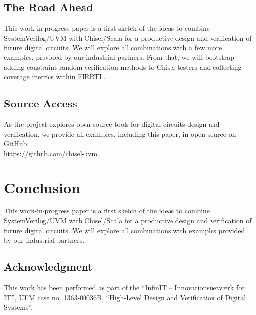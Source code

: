 \documentclass[conference]{IEEEtran}
\newcommand{\todo}[1]{{\color{olive} TODO: #1}}
\renewcommand{\todo}[1]{}
\begin{document}
\subsection{The Road Ahead}

\todo{ScalaTest and PBT with ScalaCheck.}

This work-in-progress paper is a first sketch of the ideas to combine SystemVerilog/UVM
with Chisel/Scala for a productive design and verification of future digital circuits.
We will explore all combinations with a few more examples, provided by our industrial
partners.
From that, we will bootstrap adding constraint-random verification methods to Chisel
testers and collecting coverage metrics within FIRRTL.

\subsection{Source Access}

As the project explores open-source tools for digital circuits design
and verification, we provide all examples, including this paper, in open-source
on GitHub:\\ \url{https://github.com/chisel-uvm}.


\section{Conclusion}
\label{sec:conclusion}

This work-in-progress paper is a first sketch of the ideas to combine SystemVerilog/UVM
with Chisel/Scala for a productive design and verification of future digital circuits.
We will explore all combinations with examples provided by our industrial partners.



\subsection*{Acknowledgment}

This work has been performed as part of the
``InfinIT -- Innovationsnetv{\ae}rk for IT'', UFM case no. 1363-00036B,
``High-Level Design and Verification of Digital Systems''.







\end{document}
